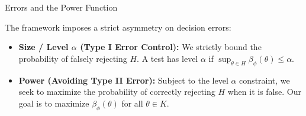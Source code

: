\documentclass[10pt, aspectratio=169, xcolor=dvipsnames]{beamer}
\newcommand{\lead}[1]{{\color{UniBlue}\bfseries #1}}
\begin{document}
\begin{frame}{Errors and the Power Function}
    
    \vspace{0.1cm}
    \begin{center}
    \end{center}

    \vspace{0cm}
    The framework imposes a strict asymmetry on decision errors:
    
    \vspace{0.2cm}
    \begin{itemize}
        \item[{ \tikz\fill[Teal] (0,0) circle (2pt); }] \lead{Size / Level $\alpha$ (Type I Error Control):} We strictly bound the probability of falsely rejecting $H$. A test has level $\alpha$ if $\sup_{\theta \in H} \beta_\phi(\theta) \le \alpha$.
        
        \vspace{0.2cm}
        \item[{ \tikz\fill[Teal] (0,0) circle (2pt); }] \lead{Power (Avoiding Type II Error):} Subject to the level $\alpha$ constraint, we seek to maximize the probability of correctly rejecting $H$ when it is false. Our goal is to maximize $\beta_\phi(\theta)$ for all $\theta \in K$.
    \end{itemize}
\end{frame}
\end{document}
